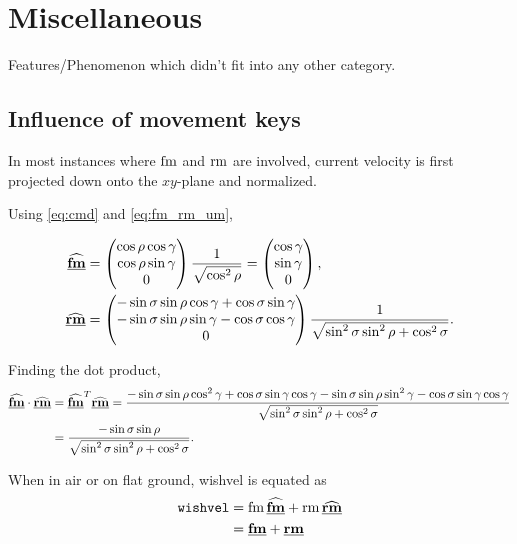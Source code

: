 \section{Miscellaneous}
\label{sec:misc}
Features/Phenomenon which didn't fit into any other category.


\subsection{Influence of movement keys}
\label{sec:movementkeys}
In most instances where $\operatorname{fm}$ and $\operatorname{rm}$ are involved, current velocity is first projected down onto the $xy$-plane and normalized.

Using \eqref{eq:cmd} and \eqref{eq:fm_rm_um},

\begin{align*}
\tuvec*{\flat{\fmove}} &=
\begin{pmatrix}
	\cos\rho\cos\gamma\\
	\cos\rho\sin\gamma\\
	0
\end{pmatrix} \frac{1}{\sqrt{\cos^2\rho}} =
\begin{pmatrix}
	\cos\gamma\\
	\sin\gamma\\
	0
\end{pmatrix},\\
\tuvec*{\flat{\rmove}} &=
\begin{pmatrix}
	-\sin\sigma\sin\rho\cos\gamma + \cos\sigma\sin\gamma\\
	-\sin\sigma\sin\rho\sin\gamma - \cos\sigma\cos\gamma\\
	0
\end{pmatrix} \frac{1}{\sqrt{\sin^2\sigma\sin^2\rho + \cos^2\sigma}}.
\end{align*}

Finding the dot product,
\begin{align*}
\tuvec*{\flat{\fmove}} \cdot \tuvec*{\flat{\rmove}} &= \tuvec*{\flat{\fmove}}^T \tuvec*{\flat{\rmove}} = \frac{-\sin\sigma\sin\rho\cos^2\gamma + \cos\sigma\sin\gamma\cos\gamma - \sin\sigma\sin\rho\sin^2\gamma - \cos\sigma\sin\gamma\cos\gamma}{\sqrt{\sin^2\sigma\sin^2\rho + \cos^2\sigma}}\\
&= \frac{-\sin\sigma\sin\rho}{\sqrt{\sin^2\sigma\sin^2\rho + \cos^2\sigma}}.
\end{align*}

When in air or on flat ground, wishvel is equated as
\begin{align*}
\texttt{wishvel} &= \fmove \tuvec*{\flat{\fmove}} + \rmove \tuvec*{\flat{\rmove}}\\
&= \tvec{\flat{\fmove}} + \tvec{\flat{\rmove}}
\end{align*}

